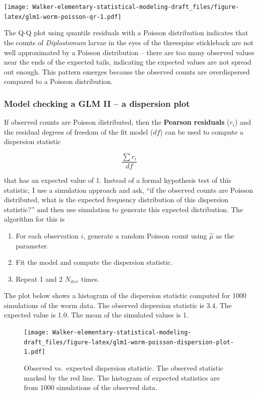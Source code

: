 \documentclass[]{book}
\providecommand{\tightlist}{%
  \setlength{\itemsep}{0pt}\setlength{\parskip}{0pt}}
\begin{document}
\texttt{[image: Walker-elementary-statistical-modeling-draft\_files/figure-latex/glm1-worm-poisson-qr-1.pdf]}

The Q-Q plot using quantile residuals with a Poisson distribution
indicates that the counts of \emph{Diplostomum} larvae in the eyes of
the threespine stickleback are not well approximated by a Poisson
distribution -- there are too many observed values near the ends of the
expected tails, indicating the expected values are not spread out
enough. This pattern emerges because the observed counts are
overdispersed compared to a Poisson distribution.

\subsubsection{Model checking a GLM II -- a dispersion
plot}\label{model-checking-a-glm-ii-a-dispersion-plot}

If observed counts are Poisson distributed, then the \textbf{Pearson
residuals} (\(r_i\)) and the residual degrees of freedom of the fit
model (\(df\)) can be used to compute a dispersion statistic

\begin{equation}
\frac{\sum{r_i}}{df}
\end{equation}

that has an expected value of 1. Instead of a formal hypothesis test of
this statistic, I use a simulation approach and ask, ``if the observed
counts are Poisson distributed, what is the expected frequency
distribution of this dispersion statistic?'' and then use simulation to
generate this expected distribution. The algorithm for this is

\begin{enumerate}
\def\labelenumi{\arabic{enumi}.}
\tightlist
\item
  For each observation \(i\), generate a random Poisson count using
  \(\hat{\mu}\) as the parameter.
\item
  Fit the model and compute the dispersion statistic.
\item
  Repeat 1 and 2 \(N_{iter}\) times.
\end{enumerate}

The plot below shows a histogram of the dispersion statistic computed
for 1000 simulations of the worm data. The observed dispersion statistic
is 3.4. The expected value is 1.0. The mean of the simulated values is
1.

\begin{figure}
\centering
\texttt{[image: Walker-elementary-statistical-modeling-draft\_files/figure-latex/glm1-worm-poisson-dispersion-plot-1.pdf]}
\caption{\label{fig:glm1-worm-poisson-dispersion-plot}Observed vs.~expected
dispersion statistic. The observed statistic marked by the red line. The
histogram of expected statistics are from 1000 simulations of the
observed data.}
\end{figure}
\end{document}
